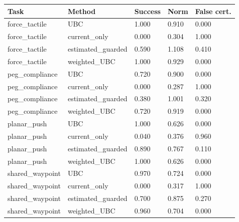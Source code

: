 \begin{tabular}{lllll}
\toprule
Task & Method & Success & Norm & False cert. \\
\midrule
force\_tactile & UBC & 1.000 & 0.910 & 0.000 \\
force\_tactile & current\_only & 0.000 & 0.304 & 1.000 \\
force\_tactile & estimated\_guarded & 0.590 & 1.108 & 0.410 \\
force\_tactile & weighted\_UBC & 1.000 & 0.929 & 0.000 \\
peg\_compliance & UBC & 0.720 & 0.900 & 0.000 \\
peg\_compliance & current\_only & 0.000 & 0.287 & 1.000 \\
peg\_compliance & estimated\_guarded & 0.380 & 1.001 & 0.320 \\
peg\_compliance & weighted\_UBC & 0.720 & 0.919 & 0.000 \\
planar\_push & UBC & 1.000 & 0.626 & 0.000 \\
planar\_push & current\_only & 0.040 & 0.376 & 0.960 \\
planar\_push & estimated\_guarded & 0.890 & 0.767 & 0.110 \\
planar\_push & weighted\_UBC & 1.000 & 0.626 & 0.000 \\
shared\_waypoint & UBC & 0.970 & 0.724 & 0.000 \\
shared\_waypoint & current\_only & 0.000 & 0.317 & 1.000 \\
shared\_waypoint & estimated\_guarded & 0.700 & 0.875 & 0.270 \\
shared\_waypoint & weighted\_UBC & 0.960 & 0.704 & 0.000 \\
\bottomrule
\end{tabular}
